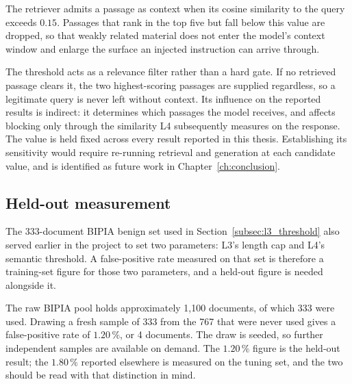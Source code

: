 The retriever admits a passage as context when its cosine similarity to the query exceeds $0.15$. Passages that rank in the top five but fall below this value are dropped, so that weakly related material does not enter the model's context window and enlarge the surface an injected instruction can arrive through.

The threshold acts as a relevance filter rather than a hard gate. If no retrieved passage clears it, the two highest-scoring passages are supplied regardless, so a legitimate query is never left without context. Its influence on the reported results is indirect: it determines which passages the model receives, and affects blocking only through the similarity L4 subsequently measures on the response. The value is held fixed across every result reported in this thesis. Establishing its sensitivity would require re-running retrieval and generation at each candidate value, and is identified as future work in Chapter~\ref{ch:conclusion}.

\subsection{Held-out measurement}
\label{subsec:threshold_circularity}

The 333-document BIPIA benign set used in Section~\ref{subsec:l3_threshold} also served earlier in the project to set two parameters: L3's length cap and L4's semantic threshold. A false-positive rate measured on that set is therefore a training-set figure for those two parameters, and a held-out figure is needed alongside it.

The raw BIPIA pool holds approximately 1{,}100 documents, of which 333 were used. Drawing a fresh sample of 333 from the 767 that were never used gives a false-positive rate of $1.20\,\%$, or 4 documents. The draw is seeded, so further independent samples are available on demand. The $1.20\,\%$ figure is the held-out result; the $1.80\,\%$ reported elsewhere is measured on the tuning set, and the two should be read with that distinction in mind.
